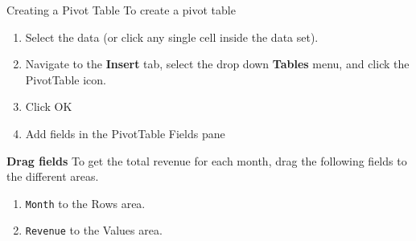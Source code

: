 \documentclass[xcolor=svgnames]{beamer}
\begin{document}
\begin{frame}{Creating a Pivot Table}
To create a pivot table
\begin{enumerate}
\item Select the data (or click any single cell inside the data set).
\item  Navigate to the {\bf Insert} tab, select the drop down {\bf Tables} menu, and click the PivotTable icon. 
\item Click OK
\item Add fields in the PivotTable Fields pane
\end{enumerate}
{\bf Drag fields}
To get the total revenue for each month, drag the following fields to the different areas.
\begin{enumerate}
\item  {\tt Month} to the Rows area.
\item {\tt Revenue} to the  Values area.
\end{enumerate}
\end{frame}

\end{document}
